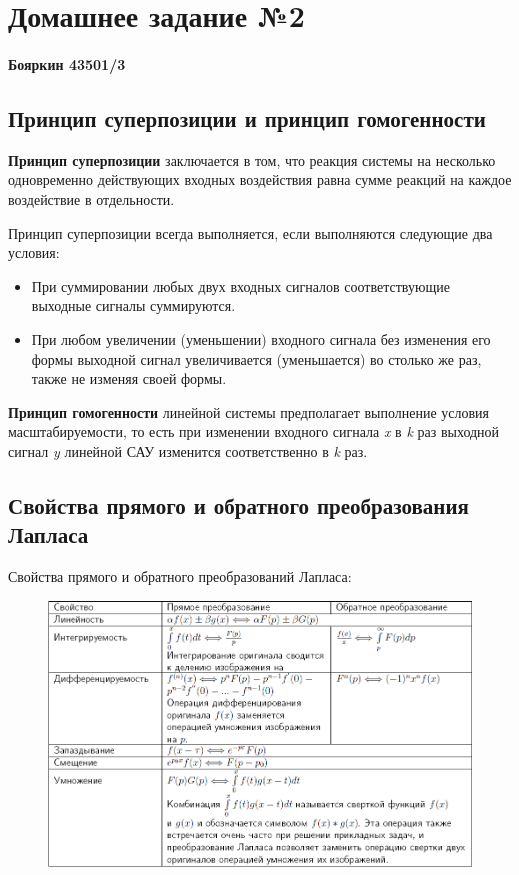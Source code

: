 \documentclass[14pt,a4paper,report]{report}
\begin{document}
\chapter{Домашнее задание №2}

\subsubsection{Бояркин 43501/3}

\section{Принцип суперпозиции и принцип гомогенности}

\textbf{Принцип суперпозиции} заключается в том, что реакция системы на несколько одновременно действующих входных воздействия равна сумме реакций на каждое воздействие в отдельности.

Принцип суперпозиции всегда выполняется, если выполняются следующие два условия:

\begin{itemize}
	\item При суммировании любых двух входных сигналов соответствующие выходные сигналы суммируются.
	\item При любом увеличении (уменьшении) входного сигнала без изменения его формы выходной сигнал увеличивается (уменьшается) во столько же раз, также не изменяя своей формы.
\end{itemize}

\textbf{Принцип гомогенности} линейной системы предполагает выполнение условия масштабируемости, то есть при изменении входного сигнала \emph{x} в \emph{k} раз выходной сигнал \emph{y} линейной САУ изменится соответственно в \emph{k} раз.

\section{Свойства прямого и обратного преобразования Лапласа}

Свойства прямого и обратного преобразований Лапласа:

\begin{figure}[h!]
	\centering
	\includegraphics[scale = 0.68]{images/1.png}
	
	\label{table:1}
\end{figure}
\end{document}
